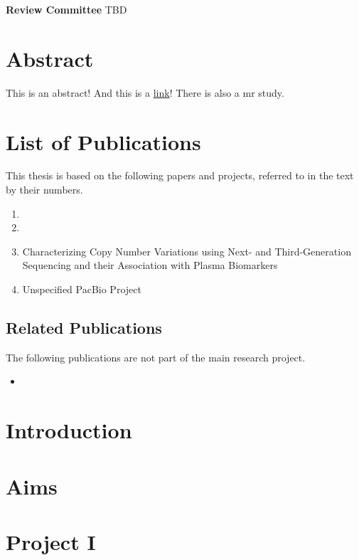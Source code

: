 \documentclass[]{scrbook}
\begin{document}
\textbf{Review Committee}
TBD

\printglossary[type=\acronymtype]

\printglossary

\chapter{Abstract}
    This is an abstract! And this is a \href{https://schmytzi.github.io/}{link}! There is also a \gls{mr} study.

\chapter{List of Publications}
This thesis is based on the following papers and projects, referred to in the text by their numbers.

\begin{enumerate}[label=\Roman*.]
    \item {}
    \item {}
    \item Characterizing Copy Number Variations using Next- and Third-Generation Sequencing and their Association with Plasma Biomarkers
    \item Unspecified PacBio Project
\end{enumerate}

\section*{Related Publications}
The following publications are not part of the main research project.
\begin{itemize}
    \item {}
\end{itemize}

\tableofcontents

\mainmatter
\glsresetall
\parskip 0pt
\parindent \oldparindent
\chapter{Introduction}

\chapter{Aims}

\chapter{Project I}
\end{document}
